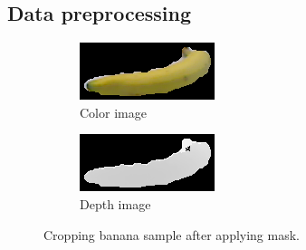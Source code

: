 \documentclass[paper=letter, fontsize=12pt]{article}
\begin{document}
\subsection{Data preprocessing}
\begin{figure}[htbp]
	\centering
	\begin{subfigure}[b]{0.32\linewidth}
		\includegraphics[width=\textwidth]{banana_1_1_1_crop}
		\caption{Color image}
	\end{subfigure}
	\begin{subfigure}[b]{0.32\linewidth}
		\includegraphics[width=\textwidth]{banana_1_1_1_depth_crop}
		\caption{Depth image}
	\end{subfigure}
	\caption{Cropping banana sample after applying mask.}
	\label{fig:banana_crop}
\end{figure}
\end{document}
